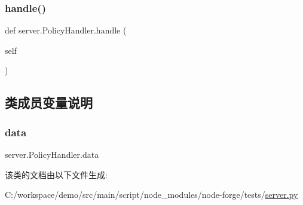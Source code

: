 \subsubsection{\texorpdfstring{handle()}{handle()}}
{\footnotesize\ttfamily def server.\+Policy\+Handler.\+handle (\begin{DoxyParamCaption}\item[{}]{self }\end{DoxyParamCaption})}



\subsection{类成员变量说明}
\mbox{\label{classserver_1_1_policy_handler_a84891878fb9dafca204a1762b43cf809}} 
\subsubsection{\texorpdfstring{data}{data}}
{\footnotesize\ttfamily server.\+Policy\+Handler.\+data}



该类的文档由以下文件生成\+:\begin{DoxyCompactItemize}
\item 
C\+:/workspace/demo/src/main/script/node\+\_\+modules/node-\/forge/tests/\mbox{\hyperlink{server_8py}{server.\+py}}\end{DoxyCompactItemize}
